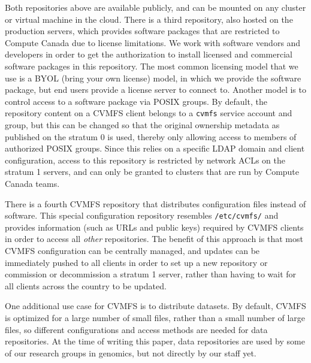 \documentclass[sigconf]{acmart}
\begin{document}
Both repositories above are available publicly, and can be mounted on any cluster or virtual machine in the cloud. There is a third repository, also hosted on the production servers, which provides software packages that are restricted to Compute Canada due to license limitations. We work with software vendors and developers in order to get the authorization to install licensed and commercial software packages in this repository. The most common licensing model that we use is a BYOL (bring your own license) model, in which we provide the software package, but end users provide a license server to connect to. Another model is to control access to a software package via POSIX groups. By default, the repository content on a CVMFS client belongs to a \texttt{cvmfs} service account and group, but this can be changed so that the original ownership metadata as published on the stratum 0 is used, thereby only allowing access to members of authorized POSIX groups. Since this relies on a specific LDAP domain and client configuration, access to this repository is restricted by network ACLs on the stratum 1 servers, and can only be granted to clusters that are run by Compute Canada teams. 

There is a fourth CVMFS repository that distributes configuration files instead of software. This special configuration repository resembles \texttt{/etc/cvmfs/} and provides information (such as URLs and public keys) required by CVMFS clients in order to access all {\it other} repositories. The benefit of this approach is that most CVMFS configuration can be centrally managed, and updates can be immediately pushed to all clients in order to set up a new repository or commission or decommission a stratum 1 server, rather than having to wait for all clients across the country to be updated.

One additional use case for CVMFS is to distribute datasets. By default, CVMFS  is optimized for a large number of small files, rather than a small number of large files, so different configurations and access methods are needed for data repositories. At the time of writing this paper, data repositories are used by some of our research groups in genomics, but not directly by our staff yet. 
\end{document}
